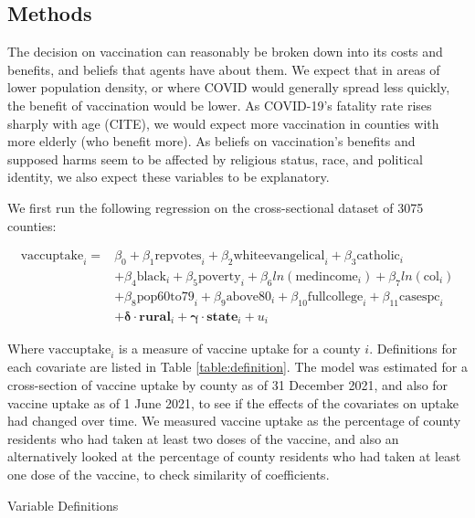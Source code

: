 \documentclass[12pt]{article}
\begin{document}
\begin{spacing}{1.5}
		\subsection{Methods}
		The decision on vaccination can reasonably be broken down into its costs and benefits, and beliefs that agents have about them. We expect that in areas of lower population density, or where COVID would generally spread less quickly, the benefit of vaccination would be lower. As COVID-19's fatality rate rises sharply with age (CITE), we would expect more vaccination in counties with more elderly (who benefit more). As beliefs on vaccination's benefits and supposed harms seem to be affected by religious status, race, and political identity, we also expect these variables to be explanatory.
		
		We first run the following regression on the cross-sectional dataset of 3075 counties:
		
		\begin{equation} \label{eq:crosssection}
			\begin{split}
				\textrm{vaccuptake}_i = &\beta_0 + \beta_1 \textrm{repvotes}_i + \beta_2 \textrm{whiteevangelical}_i + \beta_3 \textrm{catholic}_i \\ 
				&+ \beta_4 \textrm{black}_i + \beta_5 \textrm{poverty}_i + \beta_6 ln(\textrm{medincome}_i) + \beta_7 ln(\textrm{col}_i) \\ 
				&+ \beta_8 \textrm{pop60to79}_i + \beta_9 \textrm{above80}_i + \beta_{10} \textrm{fullcollege}_i + \beta_{11} \textrm{casespc}_i \\
				&+\boldsymbol{\delta}\cdot \mathbf{rural}_i + \boldsymbol{\gamma}\cdot \mathbf{state}_i + u_i
			\end{split}
		\end{equation}
		
		Where $\textrm{vaccuptake}_i$ is a measure of vaccine uptake for a county $i$. Definitions for each covariate are listed in Table \ref{table:definition}. The model was estimated for a cross-section of vaccine uptake by county as of 31 December 2021, and also for vaccine uptake as of 1 June 2021, to see if the effects of the covariates on uptake had changed over time. We measured vaccine uptake as the percentage of county residents who had taken at least two doses of the vaccine, and also an alternatively looked at the percentage of county residents who had taken at least one dose of the vaccine, to check similarity of coefficients.
		
		\begin{table}
			\caption{Variable Definitions}
			
			\label{table:definition}
		\end{table}
	

\end{spacing}
\end{document}
